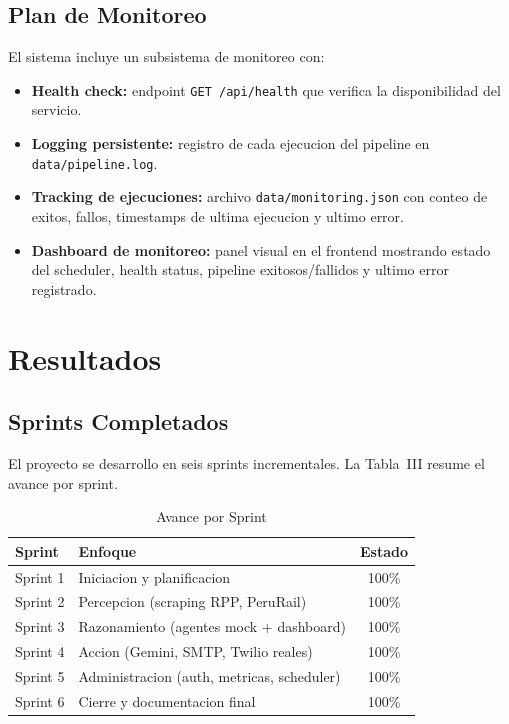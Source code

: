 \documentclass[10pt,twocolumn,a4paper]{article}
\begin{document}
\subsection{Plan de Monitoreo}

El sistema incluye un subsistema de monitoreo con:
\begin{itemize}
  \item \textbf{Health check:} endpoint \texttt{GET /api/health}
  que verifica la disponibilidad del servicio.
  \item \textbf{Logging persistente:} registro de cada ejecucion
  del pipeline en \texttt{data/pipeline.log}.
  \item \textbf{Tracking de ejecuciones:} archivo
  \texttt{data/monitoring.json} con conteo de exitos, fallos,
  timestamps de ultima ejecucion y ultimo error.
  \item \textbf{Dashboard de monitoreo:} panel visual en el
  frontend mostrando estado del scheduler, health status,
  pipeline exitosos/fallidos y ultimo error registrado.
\end{itemize}

\section{Resultados}

\subsection{Sprints Completados}

El proyecto se desarrollo en seis sprints incrementales. La
Tabla~III resume el avance por sprint.

\begin{table}[t]
\caption{Avance por Sprint}
\label{tab:sprints}
\centering
\small
\begin{tabular}{p{1.2cm}|p{4.5cm}|c}
\hline
\textbf{Sprint} & \textbf{Enfoque} & \textbf{Estado} \\
\hline
Sprint 1 & Iniciacion y planificacion & 100\% \\
Sprint 2 & Percepcion (scraping RPP, PeruRail) & 100\% \\
Sprint 3 & Razonamiento (agentes mock + dashboard) & 100\% \\
Sprint 4 & Accion (Gemini, SMTP, Twilio reales) & 100\% \\
Sprint 5 & Administracion (auth, metricas, scheduler) & 100\% \\
Sprint 6 & Cierre y documentacion final & 100\% \\
\hline
\end{tabular}
\end{table}
\end{document}

